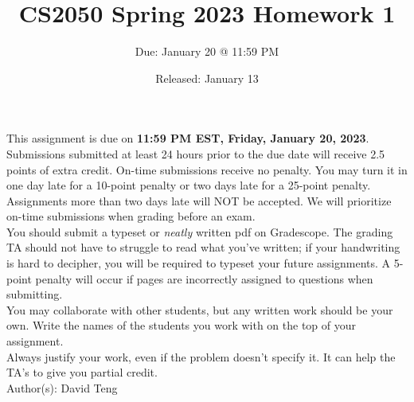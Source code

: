 \documentclass{article}
\title{CS2050 Spring 2023 Homework 1}
\author{Due: January 20 @ 11:59 PM}
\date{Released: January 13}
\begin{document}
\maketitle

This assignment is due on \textbf{11:59 PM EST, Friday, January 20, 2023}. Submissions submitted at least 24 hours prior to the due date will receive 2.5 points of extra credit. On-time submissions receive no penalty. You may turn it in one day late for a 10-point penalty or two days late for a 25-point penalty. Assignments more than two days late will NOT be accepted.  We will prioritize on-time submissions when grading before an exam. \\ 

You should submit a typeset or \emph{neatly} written pdf on Gradescope.  The grading TA should not have to struggle to read what you've written; if your handwriting is hard to decipher, you will be required to typeset your future assignments. A 5-point penalty will occur if pages are incorrectly assigned to questions when submitting.\\ 

You may collaborate with other students, but any written work should be your own. Write the names of the students you work with on the top of your assignment.\\

Always justify your work, even if the problem doesn't specify it. It can help the TA's to give you partial credit.
\\

Author(s): David Teng

\clearpage
\end{document}
